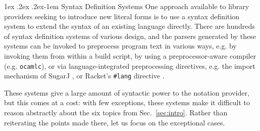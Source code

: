 \documentclass[acmsmall,screen]{acmart}
\makeatletter
\renewcommand{\paragraph}{%
  \@startsection{paragraph}{4}%
  {\z@}{1ex \@plus .2ex \@minus .2ex}{-1em}%
  {\normalfont\normalsize\bfseries}%
}
\newcommand{\li}[1]{\lstinline[basicstyle=\ttfamily\fontsize{9pt}{1em}\selectfont]{#1}}
\makeatother
\begin{document}
\paragraph{Syntax Definition Systems}\label{sec:syntax-dialects-intro}
One approach available to library providers seeking to introduce new literal forms is to use a syntax definition system to extend the syntax of an existing language directly. %
There are hundreds of syntax definition systems of various design, and the parsers generated by these systems can be invoked to preprocess program text in various ways, e.g. by invoking them from within a build script, by using a preprocessor-aware compiler (e.g. \li{ocamlc}), or via language-integrated preprocessing directives, e.g. the import mechanism of SugarJ \cite{erdweg2011sugarj}, or Racket's \li{#lang} directive \cite{Flatt:2012:CLR:2063176.2063195}. %

These systems give a large amount of syntactic power to the notation provider, but this comes at a cost: with few exceptions, these systems make it difficult to reason abstractly about the six topics from Sec.~\ref{sec:intro}. Rather than reiterating the points made there, let us focus on the exceptional cases.
\end{document}
